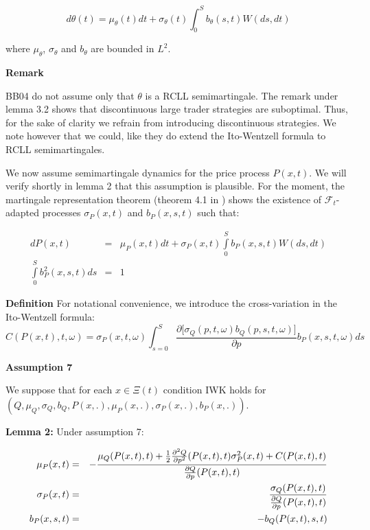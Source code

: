 \documentclass{article}
\begin{document}
\begin{equation*}
d\theta (t)=\mu _{\theta }(t)dt+\sigma _{\theta }(t)\int_{0}^{S}b_{\theta
}(s,t)W(ds,dt)
\end{equation*}

where $\mu _{\theta }$, $\sigma _{\theta }$ and $b_{\theta }$ are bounded in 
$L^{2}$.

\bigskip 

\textbf{Remark}

BB04 do not assume only that $\theta $ is a RCLL semimartingale. The remark
under lemma 3.2 shows that discontinuous large trader strategies are
suboptimal. Thus, for the sake of clarity we refrain from introducing
discontinuous strategies. We note however that we could, like they do extend
the Ito-Wentzell formula to RCLL semimartingales.

\bigskip

We now assume semimartingale dynamics for the price process $P(x,t)$. We
will verify shortly in lemma 2 that this assumption is plausible. For the
moment, the martingale representation theorem (theorem 4.1 in \cite{CT06})
shows the existence of $\mathcal{F}_{t}$-adapted processes $\sigma _{P}(x,t)$
and $b_{P}(x,s,t)$ such that:

\begin{eqnarray}
dP(x,t) &=&\mu _{P}(x,t)dt+\sigma
_{P}(x,t)\int\limits_{0}^{S}b_{P}(x,s,t)W(ds,dt)  \label{equforP} \\
\int\limits_{0}^{S}b_{P}^{2}(x,s,t)ds &=&1
\end{eqnarray}

\textbf{Definition} For notational convenience, we introduce the
cross-variation in the Ito-Wentzell formula:%
\begin{equation*}
C(P(x,t),t,\omega )=\sigma _{P}(x,t,\omega )\int_{s=0}^{S}\frac{\partial
\lbrack \sigma _{Q}(p,t,\omega )b_{Q}(p,s,t,\omega )]}{\partial p}%
b_{P}(x,s,t,\omega )ds
\end{equation*}

\textbf{Assumption 7}

We suppose that for each $x\in \Xi (t)$ condition IWK holds for $(Q,\mu
_{Q},\sigma _{Q},b_{Q},P(x,.),\mu _{P}(x,.),\sigma _{P}(x,.),b_{P}(x,.))$.

\bigskip

\textbf{Lemma 2: } Under assumption 7:

\begin{eqnarray}
\mu _{P}(x,t) &=&-\frac{\mu _{Q}(P(x,t),t)+\frac{1}{2}\frac{\partial ^{2}Q}{%
\partial p^{2}}(P(x,t),t)\sigma _{P}^{2}(x,t)+C(P(x,t),t)}{\frac{\partial Q}{%
\partial p}(P(x,t),t)}  \label{mu_Px} \\
\sigma _{P}(x,t) &=&\frac{\sigma _{Q}(P(x,t),t)}{\frac{\partial Q}{\partial p%
}(P(x,t),t)}  \label{sigma_P} \\
b_{P}(x,s,t) &=&-b_{Q}(P(x,t),s,t)  \label{b_P}
\end{eqnarray}
\end{document}
